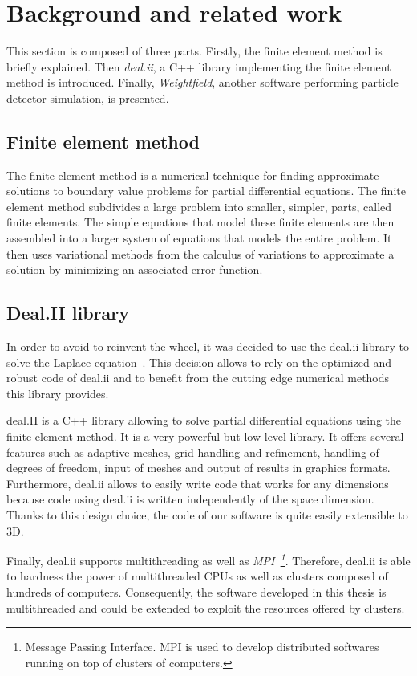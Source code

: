 \documentclass[11pt]{article}
\begin{document}
\section{Background and related work}

This section is composed of three parts. Firstly,
 the finite element method is briefly explained. Then \textit{deal.ii},
 a C++ library implementing the finite element method is introduced. Finally,
 \textit{Weightfield}, another software performing particle detector simulation,
 is presented.

	\subsection{Finite element method}

		The finite element method is a numerical technique for
		finding approximate solutions to boundary value problems for partial
		differential equations. The finite element method subdivides a large
		problem into smaller, simpler, parts, called finite elements. The
		simple equations that model these finite elements are then assembled
		into a larger system of equations that models the entire problem. It
		then uses variational methods from the calculus of variations to
		approximate a solution by minimizing an associated error function.

	\subsection{Deal.II library}

	In order to avoid to reinvent the wheel, it was decided to use the deal.ii library
	to solve the Laplace equation~\cite{Bangerth:2007:DGO:1268776.1268779}. This decision allows to rely on the optimized
	and robust code of deal.ii and to benefit from the cutting edge numerical methods this library provides.

	deal.II is a C++ library allowing to solve partial differential equations
	using the finite element method. It is a very powerful but low-level library.
	It offers several features such as adaptive meshes, grid handling
and refinement, handling of degrees of freedom, input of meshes and output of results in
graphics formats. Furthermore, deal.ii allows to easily write code that works
for any dimensions because code using deal.ii is written independently of the space
dimension. Thanks to this design choice, the code of our software is quite easily
extensible to 3D.

Finally, deal.ii supports multithreading as well as \textit{MPI~\footnote{Message
Passing Interface. MPI is used to develop distributed softwares running on top of
clusters of computers.}}. Therefore,
deal.ii is able to hardness the power of multithreaded CPUs as well as
clusters composed of hundreds of computers. Consequently,
the software developed in this thesis is multithreaded and could be extended to
exploit the resources offered by clusters.
\end{document}
